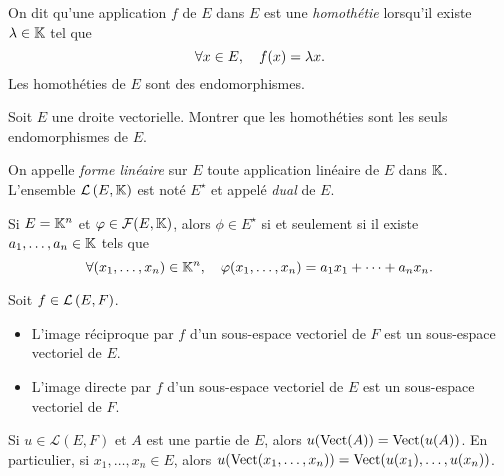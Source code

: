 \documentclass{magnolia}
\begin{document}

\begin{definition}[utile=-2]
On dit qu'une application $f$ de $E$ dans $E$ est une \emph{homothétie} lorsqu'il
existe $\lambda\in\mathbb{K}$ tel que
\[\forall x\in E ,\quad f(x)=\lambda x.\]
Les homothéties de $E$ sont des endomorphismes.
\end{definition}

\begin{exoUnique}
\exo Soit $E$ une droite vectorielle. Montrer que les homothéties sont les seuls
  endomorphismes de $E$.
\end{exoUnique}

\begin{definition}[utile=1]
On appelle \emph{forme linéaire} sur $E$ toute application linéaire de $E$ dans $\mathbb{K}$.
L'ensemble $\mathcal{L}\left(E,\mathbb{K}\right)$ est noté $E^\star$ et appelé \emph{dual} de $E$.
\end{definition}

\begin{remarqueUnique}
\remarque Si $E=\mathbb{K}^n$ et $\varphi\in\mathcal{F}(E,\mathbb{K})$, alors $\phi\in E^\star$
  si et seulement si il existe $a_1,\ldots,a_n\in\mathbb{K}$ tels que
  \[\forall (x_1,\ldots,x_n)\in\mathbb{K}^n,\quad \varphi(x_1,\ldots,x_n)=a_1x_1+\cdots+a_nx_n.\]
\end{remarqueUnique}

\begin{proposition}[utile=-3]
Soit $f\in\mathcal{L}\left(E,F\right)$.
\begin{itemize}
\item L'image réciproque par $f$ d'un sous-espace vectoriel de $F$ est un
  sous-espace vectoriel de $E$.
\item L'image directe par $f$ d'un sous-espace vectoriel de $E$ est un
  sous-espace vectoriel de $F$.
\end{itemize}
\end{proposition}

\begin{remarqueUnique}
\remarque Si $u\in\mathcal{L}(E, F)$ et $A$ est une partie de $E$, alors
  $u(\operatorname{Vect}(A))=\operatorname{Vect}(u(A))$. En particulier, si $x_1,\ldots,x_n\in E$, alors
  $u(\operatorname{Vect}(x_1,\ldots,x_n))=\operatorname{Vect}(u(x_1),\ldots,u(x_n))$.
\end{remarqueUnique}
\end{document}
